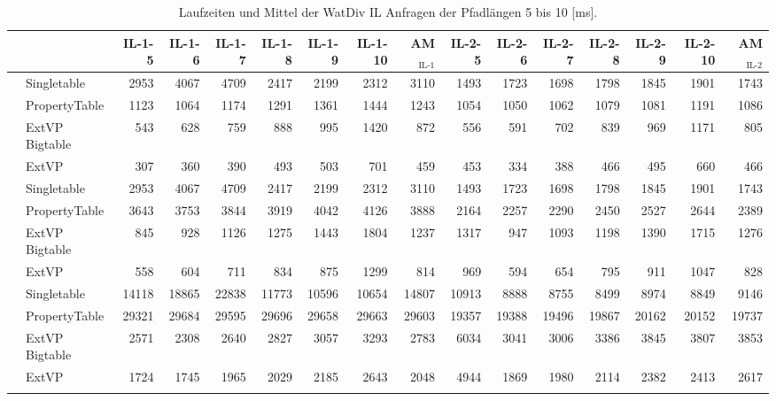 \documentclass[
  a4paper,
  twocolumn
]{scrartcl}
\begin{document}
\begin{sidewaystable*}[htbp]
	\centering
	\scriptsize
    \caption{Laufzeiten und Mittel der WatDiv IL Anfragen der Pfadlängen 5 bis 10 [ms].}
  	\label{table:runtime:watdiv:il}
  	\begin{tabular*}{\textwidth}{ @{\extracolsep{\fill}} llrrrrrr|r|rrrrrr|r }
		\toprule
		&  & IL-1-5 & IL-1-6 & IL-1-7 & IL-1-8 & IL-1-9 & IL-1-10 & AM$_{\text{IL-1}}$ & IL-2-5 & IL-2-6 & IL-2-7 & IL-2-8 & IL-2-9 & IL-2-10 & AM$_{\text{IL-2}}$ \\ 
		\midrule
		\multirow{4}{*}{\rotatebox{90}{SF10}}  
		& Singletable & 2953 & 4067 & 4709 & 2417 & 2199 & 2312 & 3110 & 1493 & 1723 & 1698 & 1798 & 1845 & 1901 & 1743 \\ 
		& PropertyTable & 1123 & 1064 & 1174 & 1291 & 1361 & 1444 & 1243 & 1054 & 1050 & 1062 & 1079 & 1081 & 1191 & 1086 \\ 
		& ExtVP Bigtable & 543 & 628 & 759 & 888 & 995 & 1420 & 872 & 556 & 591 & 702 & 839 & 969 & 1171 & 805 \\ 
		& ExtVP & 307 & 360 & 390 & 493 & 503 & 701 & 459 & 453 & 334 & 388 & 466 & 495 & 660 & 466 \\ 
		\midrule
		\multirow{4}{*}{\rotatebox{90}{SF100}} 
		& Singletable & 2953 & 4067 & 4709 & 2417 & 2199 & 2312 & 3110 & 1493 & 1723 & 1698 & 1798 & 1845 & 1901 & 1743 \\ 
		& PropertyTable & 3643 & 3753 & 3844 & 3919 & 4042 & 4126 & 3888 & 2164 & 2257 & 2290 & 2450 & 2527 & 2644 & 2389 \\ 
		& ExtVP Bigtable & 845 & 928 & 1126 & 1275 & 1443 & 1804 & 1237 & 1317 & 947 & 1093 & 1198 & 1390 & 1715 & 1276 \\ 
		& ExtVP & 558 & 604 & 711 & 834 & 875 & 1299 & 814 & 969 & 594 & 654 & 795 & 911 & 1047 & 828 \\ 
		\midrule
		\multirow{4}{*}{\rotatebox{90}{SF1000}} 
		& Singletable & 14118 & 18865 & 22838 & 11773 & 10596 & 10654 & 14807 & 10913 & 8888 & 8755 & 8499 & 8974 & 8849 & 9146 \\ 
		& PropertyTable & 29321 & 29684 & 29595 & 29696 & 29658 & 29663 & 29603 & 19357 & 19388 & 19496 & 19867 & 20162 & 20152 & 19737 \\ 
		& ExtVP Bigtable & 2571 & 2308 & 2640 & 2827 & 3057 & 3293 & 2783 & 6034 & 3041 & 3006 & 3386 & 3845 & 3807 & 3853 \\ 
		& ExtVP & 1724 & 1745 & 1965 & 2029 & 2185 & 2643 & 2048 & 4944 & 1869 & 1980 & 2114 & 2382 & 2413 & 2617 \\ 
		\midrule
		\multirow{7}{*}{\rotatebox{90}{SF10000}} 

\end{tabular*}
\end{sidewaystable*}
\end{document}
